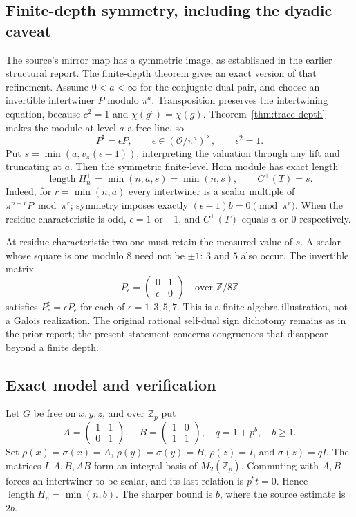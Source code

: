 \subsection{Finite-depth symmetry, including the dyadic caveat}

The source's mirror map has a symmetric image, as established in the
earlier structural report.  The finite-depth theorem gives an exact
version of that refinement.  Assume $0<a<\infty$ for the conjugate-dual
pair, and choose an invertible intertwiner $P$ modulo $\pi^a$.
Transposition preserves the intertwining equation, because $c^2=1$
and $\chi(g^c)=\chi(g)$.  Theorem~\ref{thm:trace-depth} makes the
module at level $a$ a free line, so
\[
 P^{\mathsf t}=\epsilon P,\qquad
 \epsilon\in(\mathcal O/\pi^a)^\times,\qquad \epsilon^2=1.
\]
Put $s=\min(a,v_\pi(\epsilon-1))$, interpreting the valuation through
any lift and truncating at $a$.  Then the symmetric finite-level Hom
module has exact length
\[
 \operatorname{length}H_n^+=\min(n,a,s)=\min(n,s),
 \qquad C^+(T)=s.
\]
Indeed, for $r=\min(n,a)$ every intertwiner is a scalar multiple of
$\pi^{n-r}P\bmod\pi^r$; symmetry imposes exactly
$(\epsilon-1)b=0\pmod{\pi^r}$.
When the residue characteristic is odd, $\epsilon=1$ or $-1$, and
$C^+(T)$ equals $a$ or $0$ respectively.

At residue characteristic two one must retain the measured value of
$s$.  A scalar whose square is one modulo $8$ need not be $\pm1$:
$3$ and $5$ also occur.  The invertible matrix
\[
 P_\epsilon=\begin{pmatrix}0&1\\\epsilon&0\end{pmatrix}
 \quad\text{over }\mathbb Z/8\mathbb Z
\]
satisfies $P_\epsilon^{\mathsf t}=\epsilon P_\epsilon$ for each of
$\epsilon=1,3,5,7$.  This is a finite algebra illustration, not a
Galois realization.  The original rational self-dual sign dichotomy
remains as in the prior report; the present statement concerns
congruences that disappear beyond a finite depth.

\subsection{Exact model and verification}

Let $G$ be free on $x,y,z$, and over $\mathbb Z_p$ put
\[
 A=\begin{pmatrix}1&1\\0&1\end{pmatrix},\quad
 B=\begin{pmatrix}1&0\\1&1\end{pmatrix},\quad q=1+p^b,\quad b\geq1.
\]
Set $\rho(x)=\sigma(x)=A$, $\rho(y)=\sigma(y)=B$,
$\rho(z)=I$, and $\sigma(z)=qI$.
The matrices $I,A,B,AB$ form an integral basis of $M_2(\mathbb Z_p)$.
Commuting with $A,B$ forces an intertwiner to be scalar, and its last
relation is $p^bt=0$.  Hence $\operatorname{length}H_n=\min(n,b)$.
The sharper bound is $b$, where the source estimate is $2b$.

